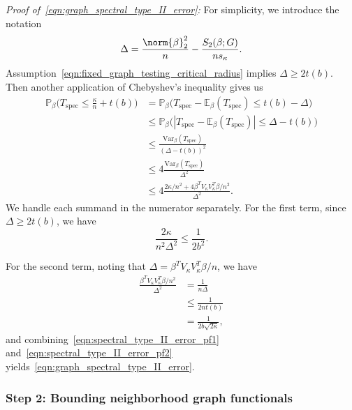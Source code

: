 \documentclass{article}
\newcommand{\abs}[1]{\left \lvert #1 \right \rvert}
\newcommand{\Var}{\mathrm{Var}}
\newcommand{\1}{\mathbf{1}}
\newcommand{\Pbb}{\mathbb{P}}
\newcommand{\Ebb}{\mathbb{E}}
\newcommand{\spec}{\mathrm{spec}}
\theoremstyle{alden}
\theoremstyle{aldenthm}
\theoremstyle{definition}
\theoremstyle{remark}
\begin{document}
\vspace{.2 in}

\textit{Proof of~\eqref{eqn:graph_spectral_type_II_error}:} For simplicity, we introduce the notation
\begin{equation*}
\Delta = \frac{\norm{\beta}_2^2}{n} - \frac{S_2(\beta;G)}{ns_{\kappa}}.
\end{equation*}
Assumption~\eqref{eqn:fixed_graph_testing_critical_radius} implies $\Delta \geq 2 t(b)$. Then another application of Chebyshev's inequality gives us
\begin{align*}
\Pbb_{\beta}\bigl(T_{\spec} \leq \frac{\kappa}{n} + t(b)\bigr) & = \Pbb_{\beta}\bigl(T_{\spec} - \Ebb_{\beta}(T_{\spec}) \leq t(b) - \Delta \bigr) \\
& \leq \Pbb_{\beta}\bigl(\abs{T_{\spec} - \Ebb_{\beta}(T_{\spec})} \leq \Delta - t(b) \bigr) \tag{since $\Delta \geq t(b)$}	\\
& \leq \frac{\Var_{\beta}(T_{\spec})}{(\Delta - t(b))^2} \\
& \leq 4\frac{\Var_{\beta}(T_{\spec})}{\Delta^2} \tag{since $\Delta \geq 2t(b)$} \\
& \leq 4\frac{2\kappa/n^2 + 4\beta^T V_{\kappa} V_{\kappa}^T \beta /n^2}{\Delta^2}.
\end{align*}
We handle each summand in the numerator separately. For the first term, since $\Delta \geq 2 t(b)$, we have
\begin{equation}
\label{eqn:spectral_type_II_error_pf1}
\frac{2\kappa}{n^2\Delta^2} \leq \frac{1}{2b^2}.
\end{equation}

For the second term, noting that $\Delta = \beta^T V_{\kappa} V_{\kappa}^T \beta/n$, we have
\begin{align}
\frac{\beta^T V_{\kappa} V_{\kappa}^T \beta/n^2}{\Delta^2} & = \frac{1}{n\Delta} \nonumber \\
& \leq \frac{1}{2nt(b)} \nonumber \\
& = \frac{1}{2b\sqrt{2\kappa}}, \label{eqn:spectral_type_II_error_pf2}
\end{align}
and combining~\eqref{eqn:spectral_type_II_error_pf1} and~\eqref{eqn:spectral_type_II_error_pf2} yields~\eqref{eqn:graph_spectral_type_II_error}.


\subsubsection{Step 2: Bounding neighborhood graph functionals}
\end{document}
